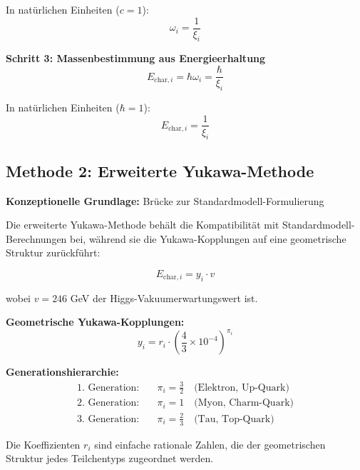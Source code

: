 	In natürlichen Einheiten ($c = 1$):
	\begin{equation}
		\omega_i = \frac{1}{\xi_i}
	\end{equation}
	
	\textbf{Schritt 3: Massenbestimmung aus Energieerhaltung}
	\begin{equation}
		E_{\text{char},i} = \hbar \omega_i = \frac{\hbar}{\xi_i}
		\label{eq:energy_from_frequency}
	\end{equation}
	
	In natürlichen Einheiten ($\hbar = 1$):
	\begin{equation}
		\boxed{E_{\text{char},i} = \frac{1}{\xi_i}}
		\label{eq:characteristic_energy_direct}
	\end{equation}
	
	\subsection{Methode 2: Erweiterte Yukawa-Methode}
	\label{subsec:extended_yukawa_method}
	
	\textbf{Konzeptionelle Grundlage:} Brücke zur Standardmodell-Formulierung
	
	Die erweiterte Yukawa-Methode behält die Kompatibilität mit Standardmodell-Berechnungen bei, während sie die Yukawa-Kopplungen auf eine geometrische Struktur zurückführt:
	
	\begin{equation}
		E_{\text{char},i} = y_i \cdot v
		\label{eq:yukawa_mass_formula}
	\end{equation}
	
	wobei $v = 246$ GeV der Higgs-Vakuumerwartungswert ist.
	
	\textbf{Geometrische Yukawa-Kopplungen:}
	\begin{equation}
		\boxed{y_i = r_i \cdot \left(\frac{4}{3} \times 10^{-4}\right)^{\pi_i}}
		\label{eq:geometric_yukawa}
	\end{equation}
	
	\textbf{Generationshierarchie:}
	\begin{align}
		\text{1. Generation:} \quad &\pi_i = \frac{3}{2} \quad \text{(Elektron, Up-Quark)} \\
		\text{2. Generation:} \quad &\pi_i = 1 \quad \text{(Myon, Charm-Quark)} \\
		\text{3. Generation:} \quad &\pi_i = \frac{2}{3} \quad \text{(Tau, Top-Quark)}
	\end{align}
	
	Die Koeffizienten $r_i$ sind einfache rationale Zahlen, die der geometrischen Struktur jedes Teilchentyps zugeordnet werden.
	
